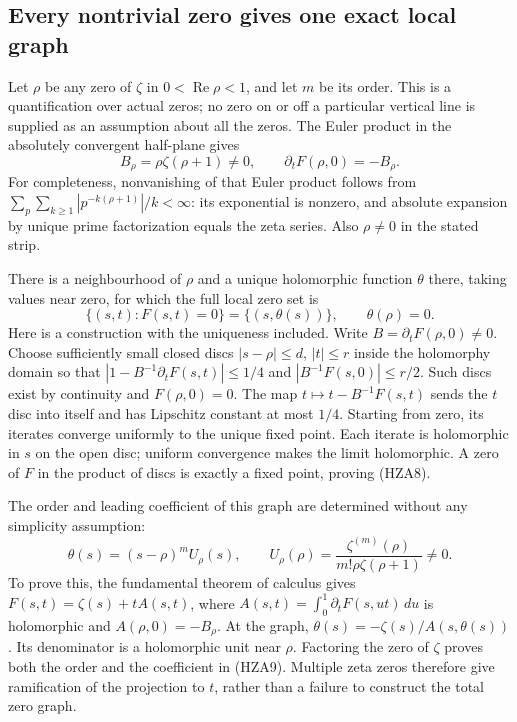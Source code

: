 \subsection{Every nontrivial zero gives one exact local graph}

Let $\rho$ be any zero of $\zeta$ in $0<\operatorname{Re}\rho<1$,
and let $m$ be its order. This is a quantification over actual zeros;
no zero on or off a particular vertical line is supplied as an
assumption about all the zeros. The Euler product in the absolutely
convergent half-plane gives
\begin{equation}\tag{HZA7}
 B_\rho=\rho\zeta(\rho+1)\ne0,
 \qquad \partial_t F(\rho,0)=-B_\rho.
\end{equation}
For completeness, nonvanishing of that Euler product follows from
$\sum_p\sum_{k\ge1}|p^{-k(\rho+1)}|/k<\infty$: its exponential is
nonzero, and absolute expansion by unique prime factorization equals
the zeta series. Also $\rho\ne0$ in the stated strip.

There is a neighbourhood of $\rho$ and a unique holomorphic function
$\theta$ there, taking values near zero, for which the full local
zero set is
\begin{equation}\tag{HZA8}
 \{(s,t):F(s,t)=0\}=\{(s,\theta(s))\},\qquad \theta(\rho)=0.
\end{equation}
Here is a construction with the uniqueness included. Write
$B=\partial_t F(\rho,0)\ne0$. Choose sufficiently small closed
discs $|s-\rho|\le d$, $|t|\le r$ inside the holomorphy domain so
that $|1-B^{-1}\partial_tF(s,t)|\le1/4$ and
$|B^{-1}F(s,0)|\le r/2$. Such discs exist by continuity and
$F(\rho,0)=0$. The map $t\mapsto t-B^{-1}F(s,t)$ sends the
$t$ disc into itself and has Lipschitz constant at most $1/4$.
Starting from zero, its iterates converge uniformly to the unique
fixed point. Each iterate is holomorphic in $s$ on the open disc;
uniform convergence makes the limit holomorphic. A zero of $F$
in the product of discs is exactly a fixed point, proving (HZA8).

The order and leading coefficient of this graph are determined
without any simplicity assumption:
\begin{equation}\tag{HZA9}
 \theta(s)=(s-\rho)^m U_\rho(s),\qquad
 U_\rho(\rho)=\frac{\zeta^{(m)}(\rho)}{m!\rho\zeta(\rho+1)}\ne0.
\end{equation}
To prove this, the fundamental theorem of calculus gives
$F(s,t)=\zeta(s)+t A(s,t)$, where
$A(s,t)=\int_0^1\partial_tF(s,ut)\,du$ is holomorphic and
$A(\rho,0)=-B_\rho$. At the graph,
$\theta(s)=-\zeta(s)/A(s,\theta(s))$. Its denominator is a
holomorphic unit near $\rho$. Factoring the zero of $\zeta$ proves
both the order and the coefficient in (HZA9). Multiple zeta zeros
therefore give ramification of the projection to $t$, rather than a
failure to construct the total zero graph.

